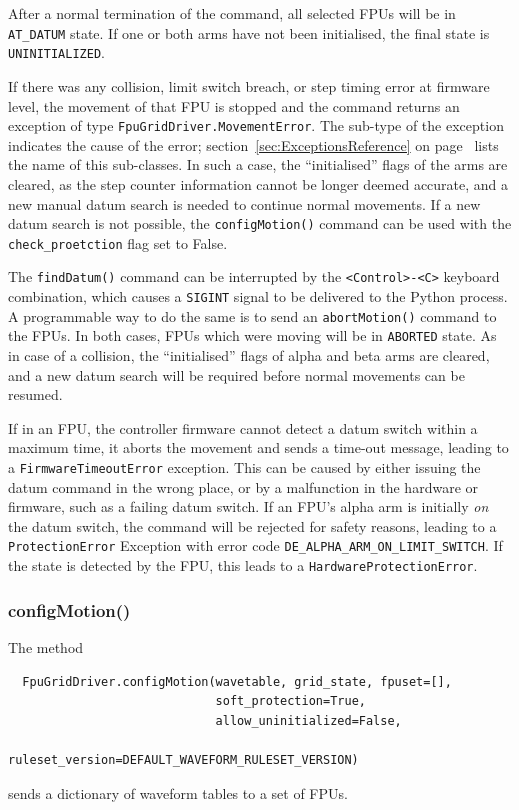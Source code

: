 \documentclass[11pt,a4paper]{report}
\begin{document}
After a normal termination of the command, all selected FPUs will be
in \texttt{AT\_DATUM} state. If one or both arms have not been
initialised, the final state is \texttt{UNINITIALIZED}.

\begin{sloppypar}
If there was any collision, limit switch breach, or step timing error
at firmware level, the movement of that FPU is stopped and the command
returns an exception of type \texttt{FpuGridDriver.MovementError}. The
sub-type of the exception indicates the cause of the error;
section~\ref{sec:ExceptionsReference} on
page~\pageref{sec:ExceptionsReference} lists the name of this
sub-classes. In such a case, the ``initialised'' flags of the arms
are cleared, as the step counter information cannot be longer deemed
accurate, and a new manual datum search is needed to continue normal
movements. If a new datum search is not possible, the
\texttt{configMotion()} command can be used with the
\texttt{check\_proetction} flag set to False.
\end{sloppypar}


The \texttt{findDatum()} command can be interrupted by the
\texttt{<Control>-<C>} keyboard combination, which causes a
\texttt{SIGINT} signal to be delivered to the Python process. A
programmable way to do the same is to send an \texttt{abortMotion()}
command to the FPUs.  In both cases, FPUs which were moving will be in
\texttt{ABORTED} state. As in case of a collision, the ``initialised''
flags of alpha and beta arms are cleared, and a new datum search will
be required before normal movements can be resumed.

If in an FPU, the controller firmware cannot detect a datum switch
within a maximum time, it aborts the movement and sends a time-out
message, leading to a \texttt{FirmwareTimeoutError} exception. This
can be caused by either issuing the datum command in the wrong place,
or by a malfunction in the hardware or firmware, such as a failing
datum switch. If an FPU's alpha arm is initially \emph{on} the datum
switch, the command will be rejected for safety reasons, leading to a
\texttt{ProtectionError} Exception with error code
\verb+DE_ALPHA_ARM_ON_LIMIT_SWITCH+. If the state is detected by the
FPU, this leads to a \texttt{HardwareProtectionError}.





\subsubsection{configMotion()}
\label{sec:configmotion}
The method
\begin{verbatim}
  FpuGridDriver.configMotion(wavetable, grid_state, fpuset=[],
                             soft_protection=True,
                             allow_uninitialized=False,
                             ruleset_version=DEFAULT_WAVEFORM_RULESET_VERSION)
\end{verbatim}
sends a dictionary of waveform tables to a set of FPUs.
\end{document}
